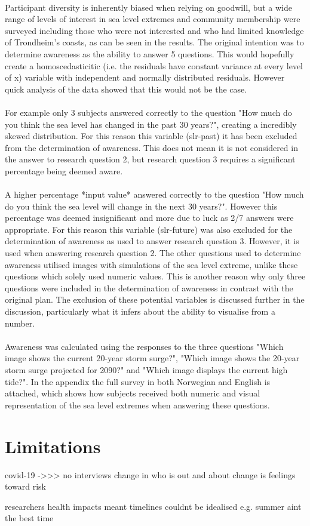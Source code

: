 \paragraph{}
  Participant diversity is inherently biased when relying on goodwill, but a wide range of levels of interest in sea level extremes and community membership were surveyed including those who were not interested and who had limited knowledge of Trondheim’s coasts, as can be seen in the results. The original intention was to determine awareness as the ability to answer 5 questions. This would hopefully create a homoscedasticitic (i.e. the residuals have constant variance at every level of x) variable with independent and normally distributed residuals. However quick analysis of the data showed that this would not be the case.
\paragraph{}
  For example only 3 subjects answered correctly to the question "How much do you think the sea level has changed in the past 30 years?", creating a incredibly skewed distribution. For this reason this variable (slr-past) it has been excluded from the determination of awareness. This does not mean it is not considered in the answer to research question 2, but research question 3 requires a significant percentage being deemed aware. 
\paragraph{}
  A higher percentage *input value* answered correctly to the question "How much do you think the sea level will change in the next 30 years?". However this percentage was deemed insignificant and more due to luck as 2/7 answers were appropriate. For this reason this variable (slr-future) was also excluded for the determination of awareness as used to answer research question 3. However, it is used when answering research question 2. The other questions used to determine awareness utilised images with simulations of the sea level extreme, unlike these questions which solely used numeric values. This is another reason why only three questions were included in the determination of awareness in contrast with the original plan. The exclusion of these potential variables is discussed further in the discussion, particularly what it infers about the ability to visualise from a number. 
\paragraph{}
Awareness was calculated using the responses to the three questions "Which image shows the current 20-year storm surge?", "Which image shows the 20-year storm surge projected for 2090?" and "Which image displays the current high tide?". In the appendix the full survey in both Norwegian and English is attached, which shows how subjects received both numeric and visual representation of the sea level extremes when answering these questions. 



\section{Limitations}
covid-19 ->>> no interviews
change in who is out and about
change is feelings toward risk

researchers health impacts meant timelines couldnt be idealised
e.g. summer aint the best time



